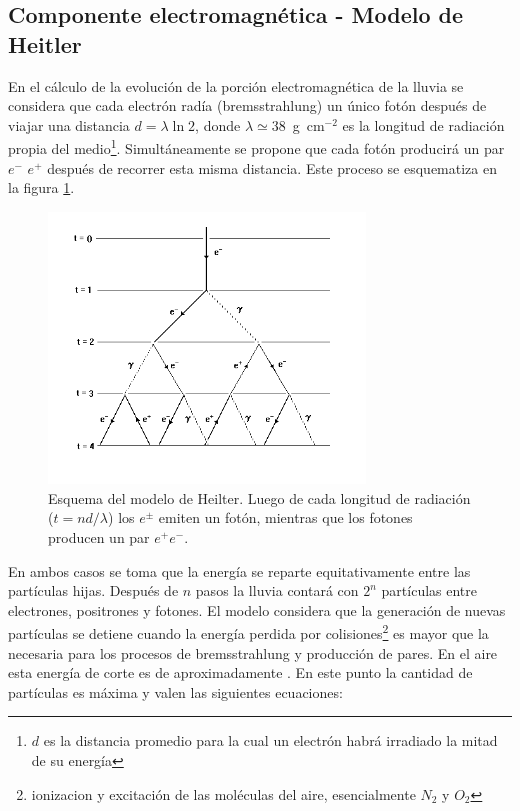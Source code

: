 \subsection{Componente electromagnética - Modelo de Heitler}
En el cálculo de la evolución de la porción electromagnética de la lluvia se considera que cada electrón radía (bremsstrahlung) un único fotón después de viajar una distancia $d=\lambda \ln 2$, donde $\lambda\simeq38$~g~cm$^{-2}$ es la longitud de radiación propia del medio\footnote{$d$ es la distancia promedio para la cual un electrón habrá irradiado la mitad de su energía}. Simultáneamente se propone que cada fotón producirá un par $e^{-}$ $e^{+}$ después de recorrer esta misma distancia.
Este proceso se esquematiza en la figura \ref{fig:heilter}.
%
\begin{figure}[ht]
\begin{center}
\includegraphics[width=0.75\textwidth]{fig/EASAuger/heilterSchema}
\caption{Esquema del modelo de Heilter. Luego de cada longitud de radiación ($t=nd/\lambda$) los $e^\pm$ emiten un fotón, mientras que los fotones producen un par $e^+e^-$.}
\label{fig:heilter}
\end{center}
\end{figure}
%
En ambos casos se toma que la energía se reparte equitativamente entre las partículas hijas. Después de $n$ pasos la lluvia contará con $2^{n}$ partículas entre electrones, positrones y fotones. El modelo considera que la generación de nuevas partículas se detiene cuando la energía perdida por colisiones\footnote{ionizacion y excitaci\'on de las mol\'eculas del aire, esencialmente $N_2$ y $O_2$} es mayor que la necesaria para los procesos de bremsstrahlung y producción de pares. En el aire esta energía de corte es de aproximadamente . En este punto la cantidad de partículas es máxima y valen las siguientes ecuaciones:
